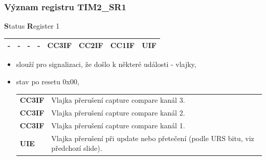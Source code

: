 	\begin{frame}
    \frametitle{Význam registru TIM2\_SR1}

		\textbf{S}tatus \textbf{R}egister 1

		\begin{center}
			\tiny
			\begin{tabular}{| p{9mm} | p{9mm} | p{9mm} | p{9mm} | p{9mm} | p{9mm} | p{9mm} | p{9mm} |}
				\hline
				\hline
				\textbf{-} & \textbf{-} & \textbf{-} & \textbf{-} & \textbf{CC3IF} & \textbf{CC2IF} & \textbf{CC1IF} & \textbf{UIF} \\
				\hline
				\hline
			\end{tabular}
		\end{center}
				
		\begin{itemize}
			\item slouží pro signalizaci, že došlo k některé události - vlajky,
			\item stav po resetu 0x00,
			\small
			\begin{center}
				\begin{tabular}{l p{80mm}}
					\textbf{CC3IF} & Vlajka přerušení capture compare kanál 3. \\
					\textbf{CC3IF} & Vlajka přerušení capture compare kanál 2.  \\
					\textbf{CC3IF} & Vlajka přerušení capture compare kanál 1. \\
					\textbf{UIE} & Vlajka přerušení při update nebo přetečení (podle URS bitu, viz předchozí slide).
				\end{tabular}
			\end{center}
		\end{itemize}
		
	\end{frame}
	
